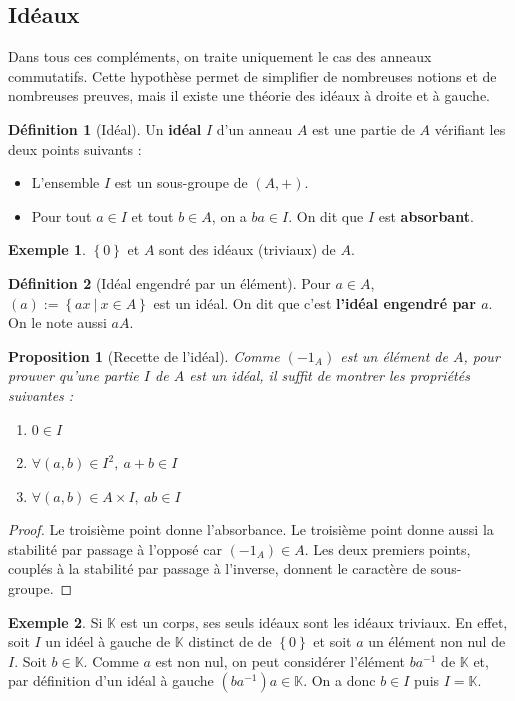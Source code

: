 \documentclass[french]{book}
\newcommand{\K}{\mathbb{K}}
\newcommand{\inv}{^{-1}}
\theoremstyle{plain}
\newtheorem{prop}{Proposition}[chapter]
\theoremstyle{definition}
\newtheorem{dfn}{Définition}[chapter]
\newtheorem{exa}{Exemple}[chapter]
\theoremstyle{remark}
\begin{document}
\subsection{Idéaux}
Dans tous ces compléments, on traite uniquement le cas des anneaux commutatifs. Cette hypothèse permet de simplifier de nombreuses notions et de nombreuses preuves, mais il existe une théorie des idéaux à droite et à gauche.
\begin{dfn}[Idéal]
	Un \textbf{idéal} $I$ d'un anneau $A$ est une partie de $A$ vérifiant les deux points suivants : 
	\begin{itemize}
		\item L'ensemble $I$ est un sous-groupe de $(A,+)$.
		\item Pour tout $a\in I$ et tout $b\in A$, on a $ba\in I$. On dit que $I$ est \textbf{absorbant}.
	\end{itemize}
\end{dfn}
\begin{exa}
	$\left\{0\right\}$ et $A$ sont des idéaux (triviaux) de $A$.
\end{exa}
\begin{dfn}[Idéal engendré par un élément]
	Pour $a\in A$, $(a):=\left\{ax \ | \ x\in A\right\}$ est un idéal. On dit que c'est \textbf{l'idéal engendré par $a$}. On le note aussi $aA$.
\end{dfn}
\begin{prop}[Recette de l'idéal]
	Comme $(-1_A)$ est un élément de $A$, pour prouver qu'une partie $I$ de $A$ est un idéal, il suffit de montrer les propriétés suivantes : 
	\begin{enumerate}
		\item $0\in I$
		\item $\forall (a,b)\in I^2,\ a+b\in I$
		\item $\forall (a,b)\in A\times I,\ ab\in I$
	\end{enumerate}
\end{prop}
\begin{proof}
	Le troisième point donne l'absorbance. Le troisième point donne aussi la stabilité par passage à l'opposé car $(-1_A)\in A$. Les deux premiers points, couplés à la stabilité par passage à l'inverse, donnent le caractère de sous-groupe. 
\end{proof}
\begin{exa}
	Si $\K$ est un corps, ses seuls idéaux sont les idéaux triviaux. En effet, soit $I$ un idéel à gauche de $\K$ distinct de de $\left\{0\right\}$ et soit $a$ un élément non nul de $I$. Soit $b\in\K$. Comme $a$ est non nul, on peut considérer l'élément $ba\inv$ de $\K$ et, par définition d'un idéal à gauche $(ba\inv)a\in\K$. On a donc $b\in I$ puis $I=\K$.
\end{exa}
\end{document}
